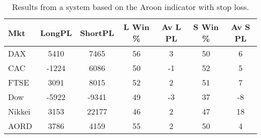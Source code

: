 \begin{table}[ht]
\centering
\caption[Results from a system based on the Aroon indicator with stop loss]{Results from a system based on the Aroon indicator with stop loss.} 
\label{tab:aroon_results_sloss}
\begin{tabular}{lcccccc}
  \toprule Mkt & LongPL & ShortPL & L Win \% & Av L PL & S Win \% & Av S PL \\ 
  \midrule DAX & 5410 & 7465 & 56 & 3 & 50 & 6 \\ 
  CAC & -1224 & 6086 & 50 & -1 & 52 & 5 \\ 
  FTSE & 3091 & 8015 & 52 & 2 & 51 & 7 \\ 
  Dow & -5922 & -9341 & 49 & -3 & 37 & -8 \\ 
  Nikkei & 3153 & 22177 & 46 & 2 & 47 & 18 \\ 
  AORD & 3786 & 4159 & 55 & 2 & 50 & 4 \\ 
   \bottomrule \end{tabular}
\end{table}
